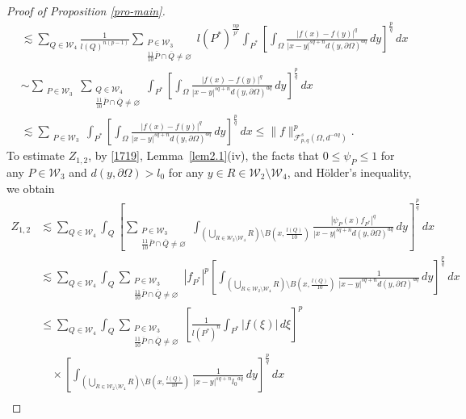 \documentclass[11pt,twoside]{article}
\def\cf{{\mathcal F}}
\def\cw{\mathcal W}
\def\pxing{P^{*}}
\def\boz{{\Omega}}
\def\pa{\partial}                %
\theoremstyle{mylem}
\theoremstyle{definition}
\numberwithin{equation}{section}
\begin{document}
\begin{proof}[Proof of Proposition \ref{pro-main}]
\begin{align}
&\lesssim \sum_{Q\in\cw_4} \frac{1}{l(Q)^{n(p-1)}}   \sum_{\substack{P\in\mathcal{W}_3\\ \frac{11}{10}\overline{P}\cap\overline{Q} \neq\varnothing}} l(\pxing)^{\frac{np}{p'}} \int_{\pxing} \left[\int_{\boz} \frac{    |f(x)-f(y)|^q 
}{|x-y|^{s q + n}d(y,\pa\boz)^{aq}}\,dy \right]^{\frac{p}{q}}\,dx
\nonumber \\
&\sim \sum_{\substack{P\in\mathcal{W}_3}} \sum_{\substack{Q\in\mathcal{W}_4\\ \frac{11}{10}\overline{P}\cap\overline{Q} \neq\varnothing}} \int_{\pxing} \left[\int_{\boz} \frac{    |f(x)-f(y)|^q 
}{|x-y|^{s q + n}d(y,\pa\boz)^{aq}}\,dy \right]^{\frac{p}{q}}\,dx \nonumber \\
&\lesssim \sum_{\substack{P\in\mathcal{W}_3}}  \int_{\pxing} \left[\int_{\boz} \frac{    |f(x)-f(y)|^q 
}{|x-y|^{s q + n}d(y,\pa\boz)^{aq}}\,dy \right]^{\frac{p}{q}}\,dx
\leq \| f \|_{\cf_{p,q}^{s}(\boz,d^{-aq})}^{p}.
\end{align}
To estimate $Z_{1,2}$, by \eqref{1719}, Lemma~\ref{lem2.1}(iv), the facts that $0\leq\psi_P\leq1$ for any $P\in\mathcal{W}_3$ and $d(y,\pa\boz)>l_0$ for any $y\in R\in\mathcal{W}_2\setminus\mathcal{W}_4$, and H\"older's inequality, we obtain
\begin{align}\label{1222}
Z_{1,2}
&\lesssim\sum_{Q\in\cw_4} \int_{Q} \left[\sum_{\substack{P\in\mathcal{W}_3\\ \frac{11}{10}\overline{P}\cap\overline{Q} \neq\varnothing}} \int_{(\bigcup_{R\in\cw_2\setminus\cw_4}R)\setminus B(x,\frac{l(Q)}{10})
} \frac{|  \psi_P(x) f_{\pxing} |^q}{|x - y|^{s q + n}d(y,\pa\boz)^{aq}}\,dy \right]^{\frac{p}{q}}\,dx\nonumber\\
&\lesssim\sum_{Q\in\cw_4} \int_{Q} \sum_{\substack{P\in\mathcal{W}_3\\ \frac{11}{10}\overline{P}\cap\overline{Q} \neq\varnothing}}|f_{\pxing}|^p \left[ \int_{(\bigcup_{R\in\cw_2\setminus\cw_4}R)\setminus B(x,\frac{l(Q)}{10})} \frac{1}{|x - y|^{s q + n}d(y,\pa\boz)^{aq}}\,dy \right]^{\frac{p}{q}}\,dx\nonumber\\
&\leq \sum_{Q\in\cw_4} \int_{Q} \sum_{\substack{P\in\mathcal{W}_3\\ \frac{11}{10}\overline{P}\cap\overline{Q} \neq\varnothing}}\left[ \frac{1}{l(\pxing)^n}\int_{P^{*}} |f(\xi)|\,d\xi\right]^p \nonumber \\
&\quad\times\left[ \int_{(\bigcup_{R\in\cw_2\setminus\cw_4}R)\setminus B(x,\frac{l(Q)}{10})} \frac{1}{|x - y|^{s q + n}{l_0}^{aq}}\,dy \right]^{\frac{p}{q}}\,dx\nonumber\\

\end{align}
\end{proof}
\end{document}
